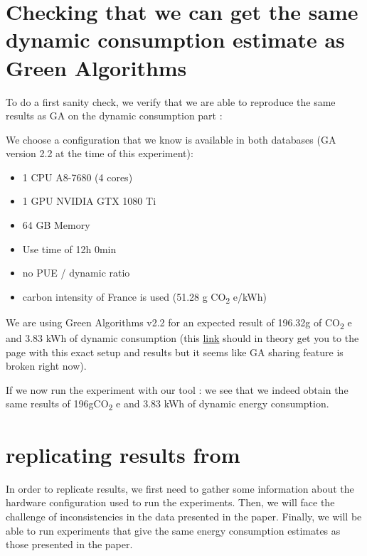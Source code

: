 \documentclass[11pt]{article}
\begin{document}
\section{Checking that we can get the same dynamic consumption estimate as Green Algorithms}
\label{sec:org30bd020}
\label{sec:ga}
To do a first sanity check, we verify that we are able to reproduce
the same results as GA on the dynamic consumption part :

We choose a configuration that we know is available in both databases
(GA version 2.2 at the time of this experiment):
\begin{itemize}
\item 1 CPU A8-7680 (4 cores)
\item 1 GPU NVIDIA GTX 1080 Ti
\item 64 GB Memory

\item Use time of 12h 0min
\item no PUE / dynamic ratio
\item carbon intensity of France is used (51.28 g CO\textsubscript{2} e/kWh)
\end{itemize}

We are using Green Algorithms v2.2
for an expected result of 196.32g of CO\textsubscript{2} e and 3.83 kWh of dynamic
consumption (this \href{http://calculator.green-algorithms.org//?runTime\_hour=12\&runTime\_min=0\&appVersion=v2.2\&locationContinent=Europe\&locationCountry=France\&locationRegion=FR\&PUEradio=Yes\&PUE=1\&coreType=Both\&numberCPUs=4\&CPUmodel=A8-7680\&numberGPUs=1\&GPUmodel=NVIDIA\%20GTX\%201080\%20Ti\&memory=64\&platformType=localServer}{link} should in theory get you to the page with this
exact setup and results but it seems like GA sharing feature is broken right
now).

If we now run the experiment with our tool :
we see that we indeed obtain the same results of 196gCO\textsubscript{2} e and 3.83
kWh of dynamic energy consumption.

\section{replicating results from \cite{Bannour2021evaluating}}
\label{sec:orgef0377d}
\label{sec:bannour}
In order to replicate results, we first need to gather some
information about the hardware configuration used to run the
experiments. Then, we will face the challenge of inconsistencies in the
data presented in the paper. Finally, we will be able to run
experiments that give the same energy consumption estimates as those
presented in the paper.
\end{document}
